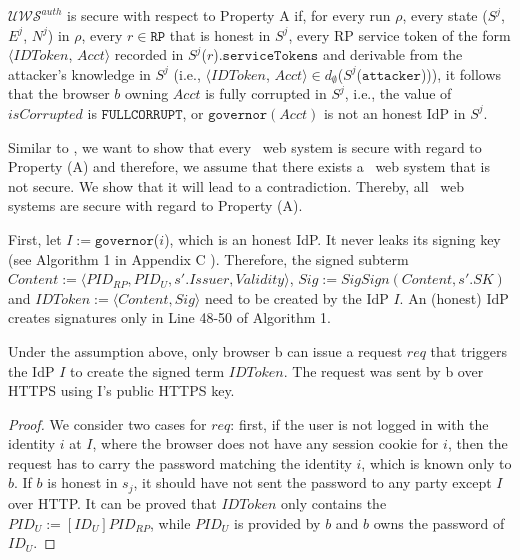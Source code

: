 \begin{definition}
$\mathcal{UWS}^{auth}$ is secure with respect to Property A if, for every run $\rho$, every state ($S^j$, $E^j$, $N^j$) in $\rho$, every $r \in \mathtt{RP}$ that is honest in $S^j$, every RP service token of the form $\langle IDToken$, $Acct \rangle$ recorded in $S^j$($r$).$\mathtt{serviceTokens}$ and derivable from the attacker's knowledge in $S^j$ (i.e., $\langle IDToken$, $Acct \rangle \in d_{\emptyset}$($S^j$($\mathtt{attacker}$))), it follows that the browser $b$ owning $Acct$ is fully corrupted in $S^j$, i.e., the value of $isCorrupted$ is $\mathtt{FULLCORRUPT}$, or $\mathtt{governor}(Acct)$ is not an honest IdP in $S^j$.
\end{definition}

Similar to \cite{SPRESSO}, we want to show that every \usso\ web system is secure with regard to Property (A) and therefore, we assume that there exists a \usso\ web system that is not secure. We show that it will lead to a contradiction. Thereby, all \usso\ web systems are secure with regard to Property (A).

First, let $I:=\mathtt{governor}$($i$), which is an honest IdP. It never leaks its signing key (see Algorithm 1 in Appendix C%
). Therefore, the signed subterm $Content:= \langle PID_{RP}, PID_U, s'.Issuer, Validity \rangle$, $Sig:= SigSign(Content, s'.SK)$ and $IDToken:= \langle Content, Sig \rangle$ need to be created by the IdP $I$.  An (honest) IdP creates signatures only in Line 48-50 of Algorithm 1.%

\begin{lemma}
\label{lemma-user-request}
Under the assumption above, only browser b can issue a request $req$ that triggers the IdP $I$ to create the signed term $IDToken$. The request was sent by b over HTTPS using I's public HTTPS key.
\end{lemma}

\begin{proof}
We consider two cases for $req$: first, if the user is not logged in with the identity $i$ at $I$, where the browser does not have any session cookie for $i$, then the request has to carry the password matching the identity $i$, which is known only to $b$. If $b$ is honest in $s_j$, it should have not sent the password to any party except $I$ over HTTP. It can be proved that $IDToken$ only contains the $PID_U:=[ID_U]PID_{RP}$, while $PID_U$ is provided by $b$ and $b$ owns the password of $ID_U$.
\end{proof}








